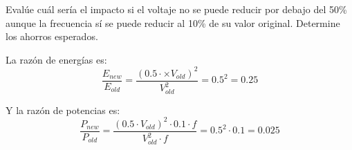 \begin{acexercise}
\end{acexercise}

Evalúe cuál sería el impacto si el voltaje no se puede reducir por debajo del 50\%
aunque la frecuencia sí se puede reducir al 10\% de su valor original.
Determine los ahorros esperados.

\begin{acsolution}
\end{acsolution}

La razón de energías es:
\[
\frac{E_{new}}{E_{old}} =
\frac{(0.5 \cdot \times V_{old})^2}{V_{old}^2} =
0.5^2 =
0.25
\] 

Y la razón de potencias es:
\[
\frac{P_{new}}{P_{old}} =
\frac{(0.5 \cdot V_{old})^2 \cdot 0.1 \cdot f}{V_{old}^2 \cdot f} =
0.5^2 \cdot 0.1 =
0.025
\]
